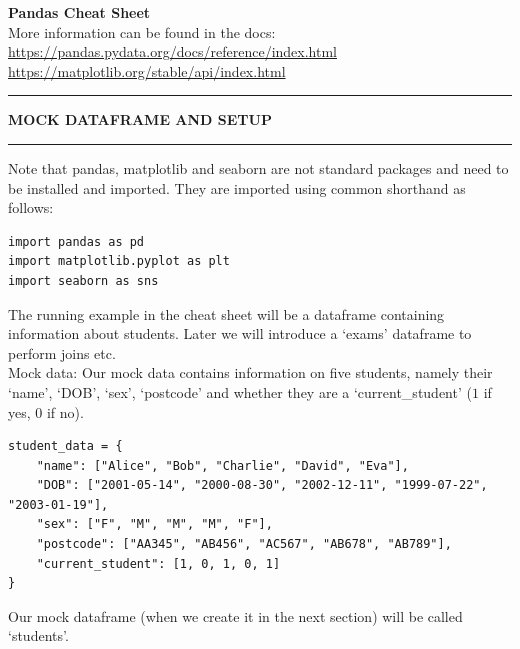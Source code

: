 \documentclass[8pt]{extarticle}
\newcommand{\heading}[1]{%
    \noindent
    \rule{\linewidth}{0.4pt}
    \begin{center}
        \vspace{-1ex}
        \textbf{#1}        
        \vspace{-2.5ex}
    \end{center}
    \rule{\linewidth}{0.4pt}
}
\begin{document}
\thispagestyle{empty} 

\begin{center}   
{\huge\textbf{Pandas Cheat Sheet}}\\
\vspace*{0.25cm}
More information can be found in the docs: \href{https://pandas.pydata.org/docs/reference/index.html}{https://pandas.pydata.org/docs/reference/index.html} \\
\hspace*{4.73cm} \href{https://matplotlib.org/stable/api/index.html}{https://matplotlib.org/stable/api/index.html}
\vspace*{0.05cm}
\end{center}

\begin{multicols}{4}
\setlength{\columnseprule}{1pt} %


\heading{MOCK DATAFRAME AND SETUP}

Note that pandas, matplotlib and seaborn are not standard packages and need to be installed and imported. They are imported using common shorthand as follows:

\begin{lstlisting}[style=Python]
import pandas as pd
import matplotlib.pyplot as plt
import seaborn as sns
\end{lstlisting}
\vspace{0.5ex}

The running example in the cheat sheet will be a dataframe containing information about students. Later we will introduce a `exams' dataframe to perform joins etc. \\

Mock data: Our mock data contains information on five students, namely their `name', `DOB', `sex', `postcode' and whether they are a 
`current\_student' ($1$ if yes, $0$ if no).
\begin{lstlisting}[style=Python]
student_data = {
    "name": ["Alice", "Bob", "Charlie", "David", "Eva"],
    "DOB": ["2001-05-14", "2000-08-30", "2002-12-11", "1999-07-22", "2003-01-19"],
    "sex": ["F", "M", "M", "M", "F"],
    "postcode": ["AA345", "AB456", "AC567", "AB678", "AB789"],
    "current_student": [1, 0, 1, 0, 1]
}
\end{lstlisting}
\vspace{0.5ex}

Our mock dataframe (when we create it in the next section) will be called `students'.\\


\end{multicols}
\end{document}
